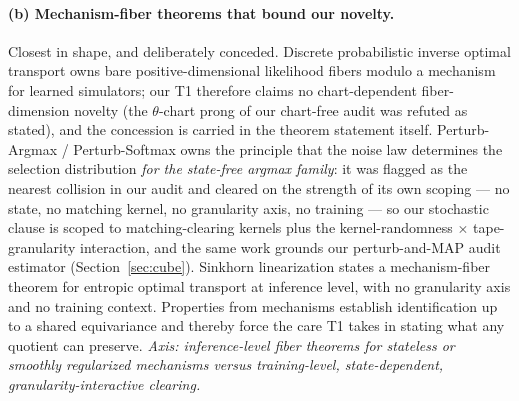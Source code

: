\paragraph{(b) Mechanism-fiber theorems that bound our novelty.}
Closest in shape, and deliberately conceded. Discrete probabilistic inverse
optimal transport \citep{dpiot2022} owns bare positive-dimensional
likelihood fibers modulo a mechanism for learned simulators; our T1
therefore claims no chart-dependent fiber-dimension novelty (the
$\theta$-chart prong of our chart-free audit was refuted as stated), and the
concession is carried in the theorem statement itself. Perturb-Argmax /
Perturb-Softmax \citep{perturbargmax2024} owns the principle that the noise
law determines the selection distribution \emph{for the state-free argmax
family}: it was
flagged as the nearest collision in our audit and cleared on the strength of
its own scoping --- no state, no matching kernel, no granularity axis, no
training --- so our stochastic clause is scoped to matching-clearing kernels
plus the kernel-randomness $\times$ tape-granularity interaction, and the
same work grounds our perturb-and-MAP audit estimator
(Section~\ref{sec:cube}). Sinkhorn linearization \citep{sinkhornlinearization2026}
states a mechanism-fiber theorem for entropic optimal transport at inference
level, with no granularity axis and no training context. Properties from
mechanisms \citep{propertiesmechanisms2022} establish identification up to a
shared equivariance and thereby force the care T1 takes in stating what any
quotient can preserve. \emph{Axis: inference-level fiber theorems for
stateless or smoothly regularized mechanisms versus training-level,
state-dependent, granularity-interactive clearing.}

